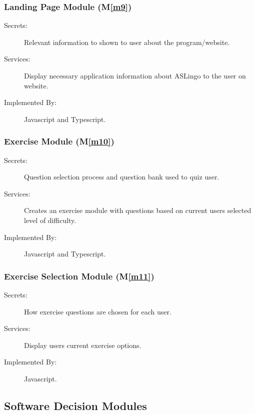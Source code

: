 \documentclass[12pt, titlepage]{article}
\newcommand{\mref}[1]{M\ref{#1}}
\begin{document}
\subsubsection{Landing Page Module (\mref{m9})}
\begin{description}
\item[Secrets:] Relevant information to shown to user about the program/website.
\item[Services:] Display necessary application information about ASLingo to the user on website.
\item[Implemented By:] Javascript and Typescript.
\end{description}

\subsubsection{Exercise Module (\mref{m10})}
\begin{description}
\item[Secrets:] Question selection process and question bank used to quiz user.
\item[Services:] Creates an exercise module with questions based on current users selected level of difficulty. 
\item[Implemented By:] Javascript and Typescript.
\end{description}

\subsubsection{Exercise Selection Module (\mref{m11})}
\begin{description}
\item[Secrets:] How exercise questions are chosen for each user.
\item[Services:] Display users current exercise options.
\item[Implemented By:] Javascript.
\end{description}

\subsection{Software Decision Modules}

\end{document}
